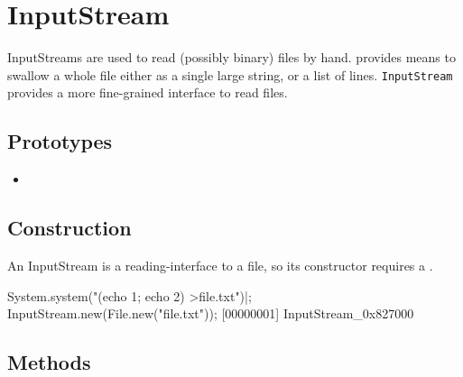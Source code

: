 \section{InputStream}

InputStreams are used to read (possibly binary) files by hand.
 provides means to swallow a whole file either as a
single large string, or a list of lines.  \lstinline|InputStream|
provides a more fine-grained interface to read files.

\subsection{Prototypes}
\begin{itemize}
\item {}
\end{itemize}

\subsection{Construction}

An InputStream is a reading-interface to a file, so its constructor
requires a .

\begin{urbiscript}
System.system("(echo 1; echo 2) >file.txt")|;
InputStream.new(File.new("file.txt"));
[00000001] InputStream_0x827000
\end{urbiscript}

\subsection{Methods}

